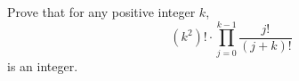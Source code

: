 Prove that for any positive integer $k$,  \[(k^2)!\cdot\displaystyle\prod_{j=0}^{k-1}\frac{j!}{(j+k)!}\]is an integer.
